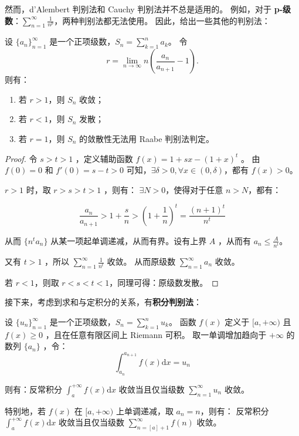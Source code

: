 然而，d'Alembert 判别法和 Cauchy 判别法并不总是适用的。
例如，对于 \textbf{p-级数}：$\sum_{n=1}^{\infty} \frac{1}{n^p}$，两种判别法都无法使用。
因此，给出一些其他的判别法：

\begin{theorem}\label{thm:raabe-test}
  设 $\{a_n\}_{n=1}^{\infty}$ 是一个正项级数，$S_n = \sum_{k=1}^{n} a_k$。
  令
  \begin{equation*}
    r = \lim_{n \to \infty} n \left( \frac{a_n}{a_{n+1}} - 1\right).
  \end{equation*}
  则有：
  \begin{enumerate}
    \item 若 $r > 1$，则 $S_n$ 收敛；
    \item 若 $r < 1$，则 $S_n$ 发散；
    \item 若 $r = 1$，则 $S_n$ 的敛散性无法用 Raabe 判别法判定。
  \end{enumerate}
\end{theorem}

\begin{proof}
  令 $s>t>1$ ，定义辅助函数 $f(x) = 1 + sx - (1 + x)^t$ 。
  由 $f(0) = 0$ 和 $f'(0) = s - t > 0$ 可知，$\exists \delta > 0, \forall x \in (0, \delta)$，都有 $f(x) > 0$。

  $r > 1$ 时，取 $r > s > t > 1$ ，则有： $\exists N > 0$，使得对于任意 $n > N$，都有：

  \begin{equation*}
    \frac{a_n}{a_{n+1}} > 1 + \frac{s}{n} > \left(1 + \frac{1}{n}\right)^t = \frac{(n+1)^t}{n^t}
  \end{equation*}

  从而 $\{n^t a_n\}$ 从某一项起单调递减，从而有界。设有上界 $A$ ，从而有 $a_n \leq \frac{A}{n^t}$。

  又有 $t > 1$ ，所以 $\sum_{n=1}^{\infty} \frac{1}{n^t}$ 收敛。
  从而原级数 $\sum_{n=1}^{\infty} a_n$ 收敛。

  若 $r < 1$，则取 $r < s < t < 1$，同理可得：原级数发散。

\end{proof}

接下来，考虑到求和与定积分的关系，有\textbf{积分判别法}：

\begin{theorem}[积分判别法]\label{thm:integral-test}
  设 $\{u_n\}_{n=1}^{\infty}$ 是一个正项级数，$S_n = \sum_{k=1}^{n} u_k$。
  函数 $f(x)$ 定义于 $[a, +\infty)$ 且 $f(x) \geq 0$ ，且在任意有限区间上 Riemann 可积。
  取一单调增加趋向于 $+\infty$ 的数列 $\{a_n\}$ ，令：$$\int_{a_n}^{a_{n+1}} f(x) \mathrm{d}x = u_n$$

  则有：反常积分 $\int_{a}^{+\infty} f(x) \mathrm{d}x$ 收敛当且仅当级数 $\sum_{n=1}^{\infty} u_n$ 收敛。

  特别地，若 $f(x)$ 在 $[a, +\infty)$ 上单调递减，取 $a_n = n$，则有：
  反常积分 $\int_{a}^{+\infty} f(x) \mathrm{d}x$ 收敛当且仅当级数 $\sum_{n=[a]+1}^{\infty} f(n)$ 收敛。
\end{theorem}

